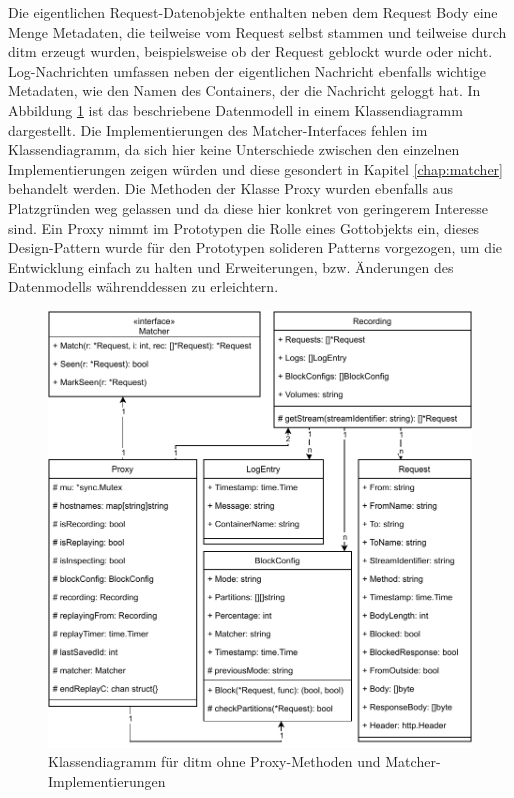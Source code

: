 \documentclass[12pt,a4paper]{report}
\begin{document}
Die eigentlichen Request-Datenobjekte enthalten neben dem Request Body eine Menge Metadaten, die teilweise vom Request selbst
stammen und teilweise durch ditm erzeugt wurden, beispielsweise ob der Request geblockt wurde oder nicht.
Log-Nachrichten umfassen neben der eigentlichen Nachricht ebenfalls wichtige Metadaten, wie den Namen des Containers, der die
Nachricht geloggt hat. In Abbildung \ref{fig:class} ist das beschriebene Datenmodell in einem Klassendiagramm dargestellt. Die
Implementierungen des Matcher-Interfaces fehlen im Klassendiagramm, da sich hier keine Unterschiede zwischen den einzelnen
Implementierungen zeigen würden und diese gesondert in Kapitel \ref{chap:matcher} behandelt werden. Die Methoden der Klasse Proxy wurden
ebenfalls aus Platzgründen weg gelassen und da diese hier konkret von geringerem Interesse sind. Ein Proxy nimmt im Prototypen die
Rolle eines Gottobjekts ein, dieses Design-Pattern wurde für den Prototypen solideren Patterns vorgezogen, um die Entwicklung
einfach zu halten und Erweiterungen, bzw. Änderungen des Datenmodells währenddessen zu erleichtern.
\begin{figure}[H]
	\centering
	\includegraphics[width=\linewidth]{img/ditm-Class.pdf}
	\caption{Klassendiagramm für ditm ohne Proxy-Methoden und Matcher-Implementierungen}
	\label{fig:class}
\end{figure}
\end{document}
